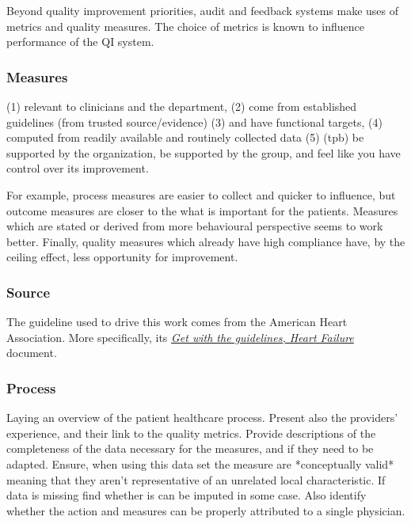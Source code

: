 

Beyond quality improvement priorities, audit and feedback systems make uses of metrics and quality measures. The choice of metrics is known to influence performance of the QI system. 

\subsubsection{Measures}

(1) relevant to clinicians and the department, (2) come from established guidelines (from trusted source/evidence) (3) and have functional targets, 
(4) computed from readily available and routinely collected data (5) (tpb) be supported by the organization, be supported by the group, and feel like you have control over its improvement.

For example, process measures are easier to collect and quicker to influence, but outcome measures are closer to the what is important for the patients. Measures which are stated or derived from more behavioural perspective seems to work better. Finally, quality measures which already have high compliance have, by the ceiling effect, less opportunity for improvement.

\subsubsection{Source}

The guideline used to drive this work comes from the American Heart Association. More specifically, its \textit{\href{https://www.heart.org/-/media/files/professional/quality-improvement/get-with-the-guidelines/get-with-the-guidelines-hf/educational-materials/hf-fact-sheet_updated-011119_v2.pdf?la=en&hash=1E39EB095FD5A513D1C3D19B22B48CEE3C6AF4B9}{Get with the guidelines, Heart Failure}} document.

\subsubsection{Process}
Laying an overview of the patient healthcare process. Present also the providers' experience, and their link to the quality metrics.
Provide descriptions of the completeness of the data necessary for the measures, and if they need to be adapted.
Ensure, when using this data set the measure are *conceptually valid* meaning that they aren't representative of an unrelated local characteristic.
If data is missing find whether is can be imputed in some case.
Also identify whether the action and measures can be properly attributed to a single physician.

